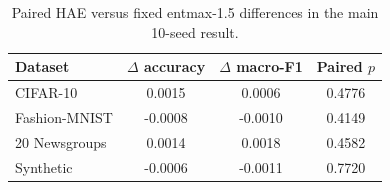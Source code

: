 \begin{table}[!htbp]
\centering
\caption{Paired HAE versus fixed entmax-1.5 differences in the main 10-seed result.}
\label{tab:hae-entmax}
\begin{tabular}{lccc}
\toprule
Dataset & $\Delta$ accuracy & $\Delta$ macro-F1 & Paired $p$ \\
\midrule
CIFAR-10 & 0.0015 & 0.0006 & 0.4776 \\
Fashion-MNIST & -0.0008 & -0.0010 & 0.4149 \\
20 Newsgroups & 0.0014 & 0.0018 & 0.4582 \\
Synthetic & -0.0006 & -0.0011 & 0.7720 \\
\bottomrule
\end{tabular}
\end{table}
